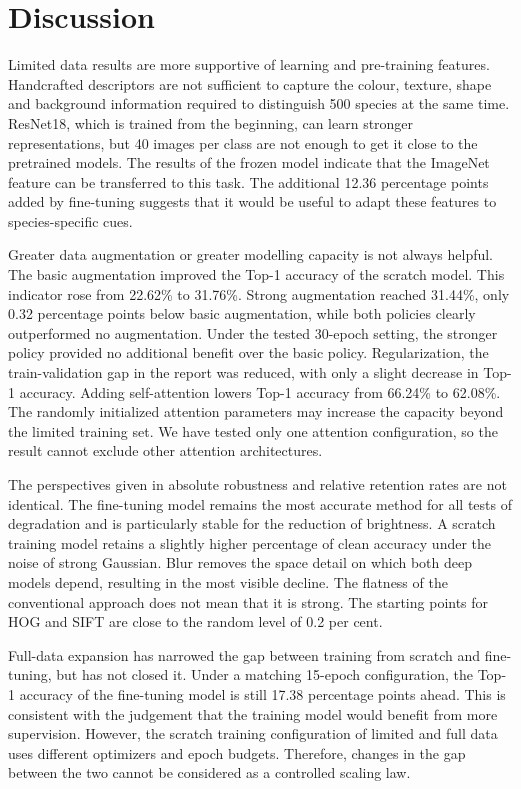 \section{Discussion}
\label{sec:discussion}

Limited data results are more supportive of learning and pre-training
features. Handcrafted descriptors are not sufficient to capture the colour,
texture, shape and background information required to distinguish 500 species
at the same time. ResNet18, which is trained from the beginning, can learn
stronger representations, but 40 images per class are not enough to get it
close to the pretrained models. The results of the frozen model indicate that
the ImageNet feature can be transferred to this task. The additional 12.36
percentage points added by fine-tuning suggests that it would be useful to
adapt these features to species-specific cues.

Greater data augmentation or greater modelling capacity is not always helpful.
The basic augmentation improved the Top-1 accuracy of the scratch model. This
indicator rose from 22.62\% to 31.76\%. Strong augmentation reached 31.44\%,
only 0.32 percentage points below basic augmentation, while both policies
clearly outperformed no augmentation. Under the tested 30-epoch setting, the
stronger policy provided no additional benefit over the basic policy.
Regularization, the train-validation gap in the report was reduced, with only a slight
decrease in Top-1 accuracy. Adding self-attention lowers Top-1 accuracy from
66.24\% to 62.08\%. The randomly initialized attention parameters may increase
the capacity beyond the limited training set. We have tested only one
attention configuration, so the result cannot exclude other attention
architectures.

The perspectives given in absolute robustness and relative retention rates are
not identical. The fine-tuning model remains the most accurate method for all
tests of degradation and is particularly stable for the reduction of
brightness. A scratch training model retains a slightly higher percentage of
clean accuracy under the noise of strong Gaussian. Blur removes the space
detail on which both deep models depend, resulting in the most visible
decline. The flatness of the conventional approach does not mean that it is
strong. The starting points for HOG and SIFT are close to the random level of
0.2 per cent.

Full-data expansion has narrowed the gap between training from scratch and
fine-tuning, but has not closed it. Under a matching 15-epoch configuration,
the Top-1 accuracy of the fine-tuning model is still 17.38 percentage points
ahead. This is consistent with the judgement that the training model would
benefit from more supervision. However, the scratch training configuration of
limited and full data uses different optimizers and epoch budgets. Therefore,
changes in the gap between the two cannot be considered as a controlled
scaling law.

